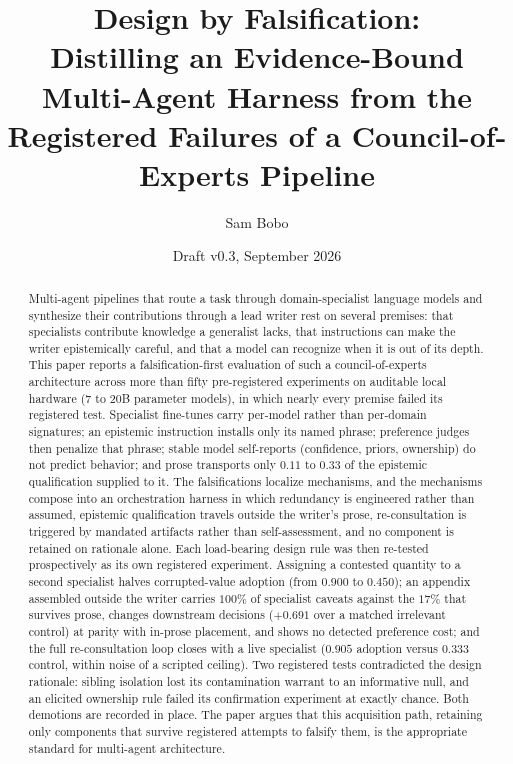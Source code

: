 \documentclass[11pt]{article}
\title{Design by Falsification:\\
Distilling an Evidence-Bound Multi-Agent Harness from the\\
Registered Failures of a Council-of-Experts Pipeline}
\author{Sam Bobo}
\date{Draft v0.3, September 2026}
\begin{document}
\maketitle

\begin{abstract}
Multi-agent pipelines that route a task through domain-specialist
language models and synthesize their contributions through a lead
writer rest on several premises: that specialists contribute knowledge
a generalist lacks, that instructions can make the writer epistemically
careful, and that a model can recognize when it is out of its depth.
This paper reports a falsification-first evaluation of such a
council-of-experts architecture across more than fifty pre-registered
experiments on auditable local hardware (7 to 20B parameter models), in
which nearly every premise failed its registered test. Specialist
fine-tunes carry per-model rather than per-domain signatures; an
epistemic instruction installs only its named phrase; preference judges
then penalize that phrase; stable model self-reports (confidence,
priors, ownership) do not predict behavior; and prose transports only
$0.11$ to $0.33$ of the epistemic qualification supplied to it. The
falsifications localize mechanisms, and the mechanisms compose into an
orchestration harness in which redundancy is engineered rather than
assumed, epistemic qualification travels outside the writer's prose,
re-consultation is triggered by mandated artifacts rather than
self-assessment, and no component is retained on rationale alone. Each
load-bearing design rule was then re-tested prospectively as its own
registered experiment. Assigning a contested quantity to a second
specialist halves corrupted-value adoption (from $0.900$ to $0.450$);
an appendix assembled outside the writer carries $100\%$ of specialist
caveats against the $17\%$ that survives prose, changes downstream
decisions ($+0.691$ over a matched irrelevant control) at parity with
in-prose placement, and shows no detected preference cost; and the full
re-consultation loop closes with a live specialist ($0.905$ adoption
versus $0.333$ control, within noise of a scripted ceiling). Two
registered tests contradicted the design rationale: sibling isolation
lost its contamination warrant to an informative null, and an elicited
ownership rule failed its confirmation experiment at exactly chance.
Both demotions are recorded in place. The paper argues that this
acquisition path, retaining only components that survive registered
attempts to falsify them, is the appropriate standard for multi-agent
architecture.
\end{abstract}
\end{document}
